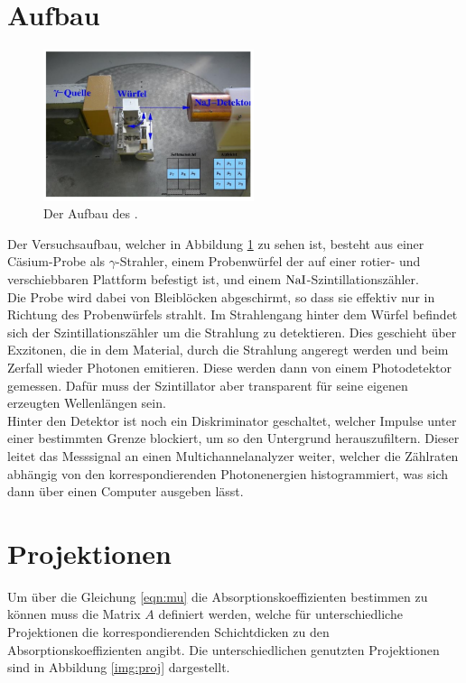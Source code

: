 \newpage
\section{Aufbau}

\begin{figure}[H]
    \centering
    \includegraphics[width=0.55\textwidth]{latex/images/aufbau.PNG}
    \caption{Der Aufbau des \protect \cite{V14}.}
    \label{img:aufb}
\end{figure}

Der Versuchsaufbau, welcher in Abbildung \ref{img:aufb} zu sehen ist, besteht aus einer Cäsium-Probe als $\gamma$-Strahler, 
einem Probenwürfel der auf einer rotier- und verschiebbaren Plattform befestigt ist, und einem $\ce{NaI}$-Szintillationszähler.\\
Die Probe wird dabei von Bleiblöcken abgeschirmt, so dass sie effektiv nur in Richtung des Probenwürfels strahlt. 
Im Strahlengang hinter dem Würfel befindet sich der Szintillationszähler um die Strahlung zu detektieren. 
Dies geschieht über Exzitonen, die in dem Material, durch die Strahlung angeregt werden und beim Zerfall wieder Photonen emitieren. 
Diese werden dann von einem Photodetektor gemessen. Dafür muss der Szintillator aber transparent für seine eigenen erzeugten Wellenlängen sein.\\
Hinter den Detektor ist noch ein Diskriminator geschaltet, welcher Impulse unter einer bestimmten Grenze blockiert, um so den Untergrund herauszufiltern.
Dieser leitet das Messsignal an einen Multichannelanalyzer weiter, welcher die Zählraten abhängig von den korrespondierenden Photonenergien histogrammiert, 
was sich dann über einen Computer ausgeben lässt.

\section{Projektionen}

\noindent
Um über die Gleichung \ref{eqn:mu} die Absorptionskoeffizienten bestimmen zu können muss die Matrix $A$ definiert werden, 
welche für unterschiedliche  Projektionen die korrespondierenden Schichtdicken zu den Absorptionskoeffizienten angibt. 
Die unterschiedlichen genutzten Projektionen sind in Abbildung \ref{img:proj} dargestellt.


